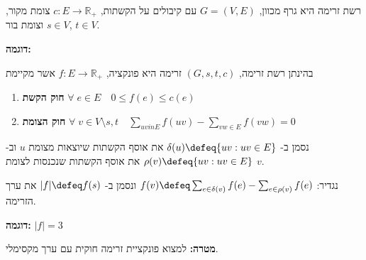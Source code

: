 \begin{definition}
רשת זרימה היא גרף מכוון, 
$G = (V, E)$ 
עם קיבולים על הקשתות,
$c:E \to \mathbb{R}_+$
צומת מקור,
$s \in V$
וצומת בור,
$t \in V$.
\end{definition}

\textbf{דוגמה:}

\begin{center}
\end{center}


\begin{definition}[זרימה]
בהינתן רשת זרימה,
$(G, s, t, c)$
זרימה היא פונקציה,
$f:E \to \mathbb{R_+}$
אשר מקיימת
\begin{enumerate}
\item
\textbf{חוק הקשת}
$\forall \; e \in E \hspace{1em} 0 \leq f(e) \leq c(e)$
\item
\textbf{חוק הצומת}
$\forall \; v \in V \setminus {s,t} \hspace{1em} 
\sum_{uv in E} f(uv) - \sum_{vw \in E} f(vw) = 0$
\end{enumerate}

\end{definition}

נסמן ב-%
$\delta(u) \defeq \{uv : uv \in E\}$
את אוסף הקשתות שיוצאות מצומת $u$ וב-%
$\rho(v) \defeq \{uv : uv \in E\}$
את אוסף הקשתות שנכנסות לצומת $v$.

נגדיר:
$f(v) \defeq \sum_{e \in \delta(v)} f(e) - \sum_{e \in \rho(v)} f(e)$
ונסמן ב-%
$|f| \defeq f(s)$
את ערך הזרימה.

\textbf{דוגמה:}
$|f| = 3$

\begin{center}
\end{center}

\textbf{מטרה:}
למצוא פונקציית זרימה חוקית עם ערך מקסימלי.
